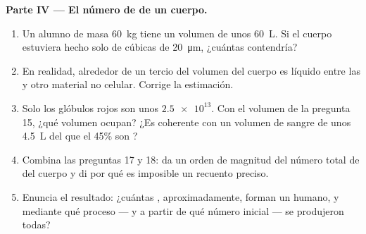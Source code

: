 \begin{problem}
\medskip
\noindent\textbf{Parte IV --- El número de  de un cuerpo.}
\begin{enumerate}[resume]
  \item Un alumno de masa \qty{60}{kg} tiene un volumen de unos
        \qty{60}{L}. Si el cuerpo estuviera hecho solo de 
        cúbicas de \qty{20}{\micro m}, ¿cuántas contendría?
  \item En realidad, alrededor de un tercio del volumen del cuerpo es
        líquido entre las  y otro material no celular. Corrige
        la estimación.
  \item Solo los glóbulos rojos son unos $\num{2.5e13}$. Con el volumen
        de la pregunta 15, ¿qué volumen ocupan? ¿Es coherente con un
        volumen de sangre de unos \qty{4.5}{L} del que el 45\% son
        ?
  \item Combina las preguntas 17 y 18: da un orden de magnitud del
        número total de  del cuerpo y di por qué es imposible un
        recuento preciso.
  \item Enuncia el resultado: ¿cuántas , aproximadamente, forman
        un humano, y mediante qué proceso --- y a partir de qué número
        inicial --- se produjeron todas?
\end{enumerate}
\end{problem}
